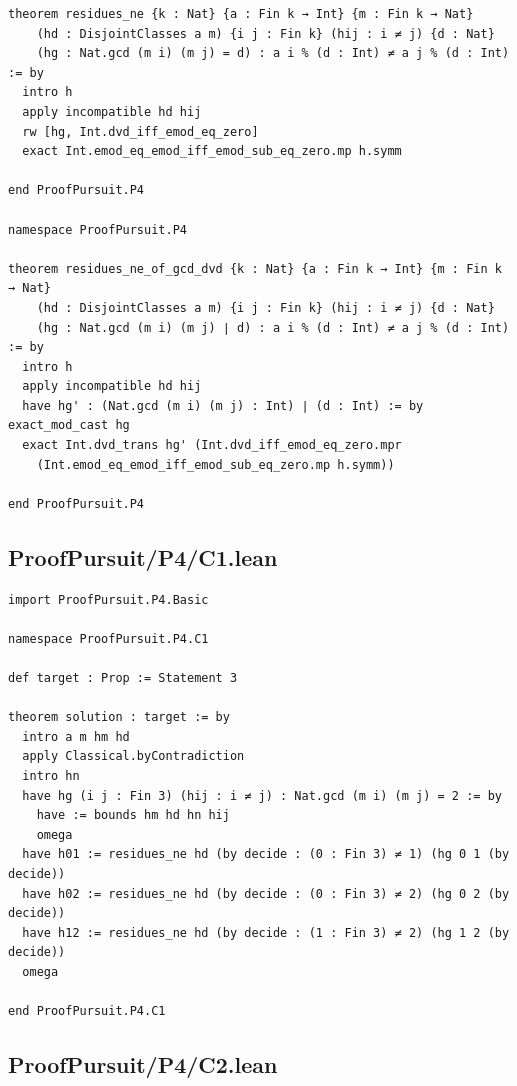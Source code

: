 \documentclass[11pt,a4paper]{article}
\begin{document}
\begin{Verbatim}[breaklines,breakanywhere,fontsize=\footnotesize]
theorem residues_ne {k : Nat} {a : Fin k → Int} {m : Fin k → Nat}
    (hd : DisjointClasses a m) {i j : Fin k} (hij : i ≠ j) {d : Nat}
    (hg : Nat.gcd (m i) (m j) = d) : a i % (d : Int) ≠ a j % (d : Int) := by
  intro h
  apply incompatible hd hij
  rw [hg, Int.dvd_iff_emod_eq_zero]
  exact Int.emod_eq_emod_iff_emod_sub_eq_zero.mp h.symm

end ProofPursuit.P4

namespace ProofPursuit.P4

theorem residues_ne_of_gcd_dvd {k : Nat} {a : Fin k → Int} {m : Fin k → Nat}
    (hd : DisjointClasses a m) {i j : Fin k} (hij : i ≠ j) {d : Nat}
    (hg : Nat.gcd (m i) (m j) ∣ d) : a i % (d : Int) ≠ a j % (d : Int) := by
  intro h
  apply incompatible hd hij
  have hg' : (Nat.gcd (m i) (m j) : Int) ∣ (d : Int) := by exact_mod_cast hg
  exact Int.dvd_trans hg' (Int.dvd_iff_emod_eq_zero.mpr
    (Int.emod_eq_emod_iff_emod_sub_eq_zero.mp h.symm))

end ProofPursuit.P4
\end{Verbatim}

\subsection{ProofPursuit/P4/C1.lean}\label{proofpursuitp4c1.lean}

\begin{Verbatim}[breaklines,breakanywhere,fontsize=\footnotesize]
import ProofPursuit.P4.Basic

namespace ProofPursuit.P4.C1

def target : Prop := Statement 3

theorem solution : target := by
  intro a m hm hd
  apply Classical.byContradiction
  intro hn
  have hg (i j : Fin 3) (hij : i ≠ j) : Nat.gcd (m i) (m j) = 2 := by
    have := bounds hm hd hn hij
    omega
  have h01 := residues_ne hd (by decide : (0 : Fin 3) ≠ 1) (hg 0 1 (by decide))
  have h02 := residues_ne hd (by decide : (0 : Fin 3) ≠ 2) (hg 0 2 (by decide))
  have h12 := residues_ne hd (by decide : (1 : Fin 3) ≠ 2) (hg 1 2 (by decide))
  omega

end ProofPursuit.P4.C1
\end{Verbatim}

\subsection{ProofPursuit/P4/C2.lean}\label{proofpursuitp4c2.lean}
\end{document}
